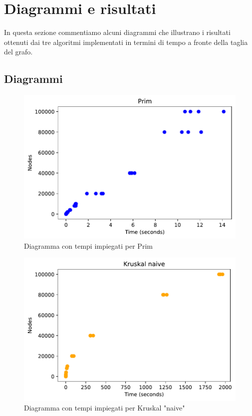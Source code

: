\chapter{Diagrammi e risultati\label{sec:risultati}}
\noindent In questa sezione commentiamo alcuni diagrammi che illustrano i risultati ottenuti dai tre algoritmi implementati in termini di tempo a fronte della taglia del grafo.

\section{Diagrammi\label{sec:diagrammi}}

\begin{figure}[htp]
    \centering
    \includegraphics[width=\textwidth]{immagini/prim.pdf}
    \caption{Diagramma con tempi impiegati per Prim}
    \label{fig:diagramma-prim}
\end{figure}

\begin{figure}[htp]
    \centering
    \includegraphics[width=\textwidth]{immagini/naive.pdf}
    \caption{Diagramma con tempi impiegati per Kruskal "naive"}
    \label{fig:diagramma-naive}
\end{figure}

